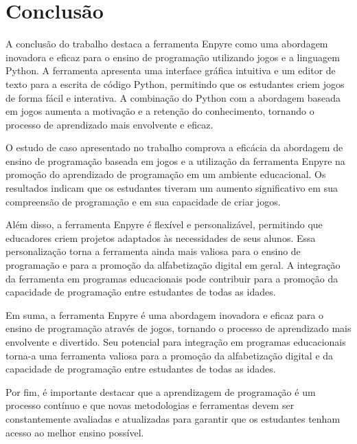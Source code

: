 \chapter[Conclusão]{Conclusão}

A conclusão do trabalho destaca a ferramenta Enpyre como uma abordagem inovadora e eficaz para o ensino de programação utilizando jogos e a linguagem Python. A ferramenta apresenta uma interface gráfica intuitiva e um editor de texto para a escrita de código Python, permitindo que os estudantes criem jogos de forma fácil e interativa. A combinação do Python com a abordagem baseada em jogos aumenta a motivação e a retenção do conhecimento, tornando o processo de aprendizado mais envolvente e eficaz.

O estudo de caso apresentado no trabalho comprova a eficácia da abordagem de ensino de programação baseada em jogos e a utilização da ferramenta Enpyre na promoção do aprendizado de programação em um ambiente educacional. Os resultados indicam que os estudantes tiveram um aumento significativo em sua compreensão de programação e em sua capacidade de criar jogos.

Além disso, a ferramenta Enpyre é flexível e personalizável, permitindo que educadores criem projetos adaptados às necessidades de seus alunos. Essa personalização torna a ferramenta ainda mais valiosa para o ensino de programação e para a promoção da alfabetização digital em geral. A integração da ferramenta em programas educacionais pode contribuir para a promoção da capacidade de programação entre estudantes de todas as idades.

Em suma, a ferramenta Enpyre é uma abordagem inovadora e eficaz para o ensino de programação através de jogos, tornando o processo de aprendizado mais envolvente e divertido. Seu potencial para integração em programas educacionais torna-a uma ferramenta valiosa para a promoção da alfabetização digital e da capacidade de programação entre estudantes de todas as idades.

Por fim, é importante destacar que a aprendizagem de programação é um processo contínuo e que novas metodologias e ferramentas devem ser constantemente avaliadas e atualizadas para garantir que os estudantes tenham acesso ao melhor ensino possível.
